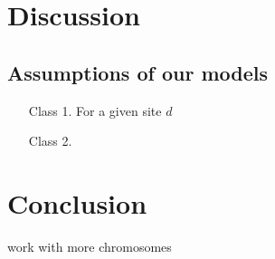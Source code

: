 \documentclass{article} %
\begin{document}
\section{Discussion}

\subsection{Assumptions of our models}
\begin{enumerate}
\item [Class 1.] For a given site $d$ 
\item [Class 2.]
\end{enumerate}

\section{Conclusion}
work with more chromosomes



\end{document}
